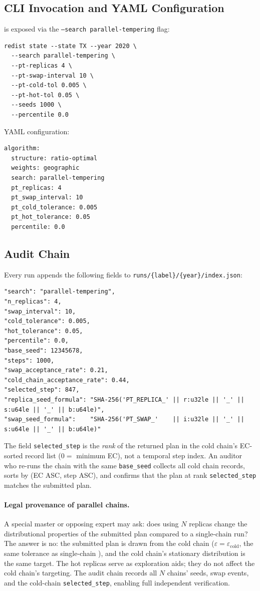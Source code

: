 \subsection{CLI Invocation and YAML Configuration}

\pt{} is exposed via the \texttt{--search parallel-tempering} flag:
\begin{verbatim}
redist state --state TX --year 2020 \
  --search parallel-tempering \
  --pt-replicas 4 \
  --pt-swap-interval 10 \
  --pt-cold-tol 0.005 \
  --pt-hot-tol 0.05 \
  --seeds 1000 \
  --percentile 0.0
\end{verbatim}

YAML configuration:
\begin{verbatim}
algorithm:
  structure: ratio-optimal
  weights: geographic
  search: parallel-tempering
  pt_replicas: 4
  pt_swap_interval: 10
  pt_cold_tolerance: 0.005
  pt_hot_tolerance: 0.05
  percentile: 0.0
\end{verbatim}

\subsection{Audit Chain}

Every run appends the following fields to \texttt{runs/\{label\}/\{year\}/index.json}:
\begin{verbatim}
"search": "parallel-tempering",
"n_replicas": 4,
"swap_interval": 10,
"cold_tolerance": 0.005,
"hot_tolerance": 0.05,
"percentile": 0.0,
"base_seed": 12345678,
"steps": 1000,
"swap_acceptance_rate": 0.21,
"cold_chain_acceptance_rate": 0.44,
"selected_step": 847,
"replica_seed_formula": "SHA-256('PT_REPLICA_' || r:u32le || '_' || s:u64le || '_' || b:u64le)",
"swap_seed_formula":    "SHA-256('PT_SWAP_'    || i:u32le || '_' || s:u64le || '_' || b:u64le)"
\end{verbatim}

The field \texttt{selected\_step} is the \emph{rank} of the returned plan in
the cold chain's EC-sorted record list ($0 =$ minimum EC), not a temporal step
index.
An auditor who re-runs the chain with the same \texttt{base\_seed} collects all
cold chain records, sorts by (EC ASC, step ASC), and confirms that the plan at
rank \texttt{selected\_step} matches the submitted plan.

\paragraph{Legal provenance of parallel chains.}
A special master or opposing expert may ask: does using $N$ replicas change the
distributional properties of the submitted plan compared to a single-chain
\fr{} run?
The answer is no: the submitted plan is drawn from the cold chain
($\varepsilon = \varepsilon_{\text{cold}}$, the same tolerance as single-chain
\fr{}), and the cold chain's stationary distribution is the same \fr{} target.
The hot replicas serve as exploration aids; they do not affect the cold chain's
targeting.
The audit chain records all $N$ chains' seeds, swap events, and the cold-chain
\texttt{selected\_step}, enabling full independent verification.


